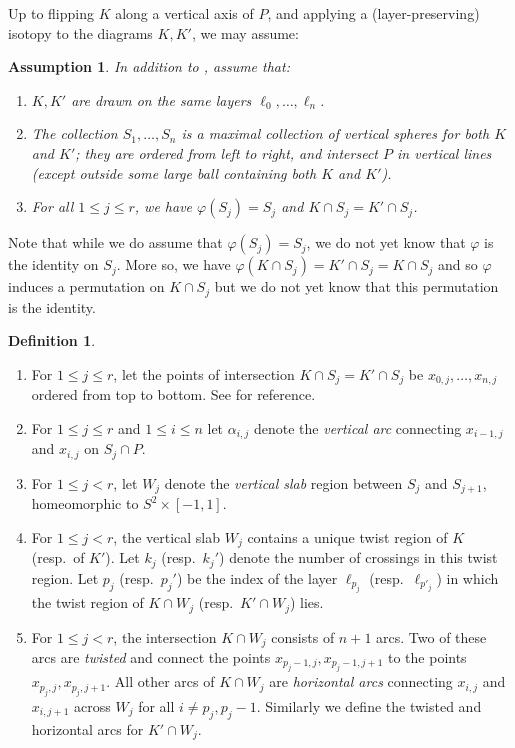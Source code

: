 \documentclass[12pt,reqno]{amsart}
\theoremstyle{plain}
\newtheorem{assumption}[theorem]{Assumption}
\theoremstyle{definition}
\newtheorem{definition}[theorem]{Definition}
\begin{document}
Up to flipping $K$ along a vertical axis of $P$, and applying a (layer-preserving) 
isotopy to the diagrams $K,K'$, we may assume:
\begin{assumption}\label{assum:FlipVertical}
In addition to , assume that:
\begin{enumerate}
\item $K,K'$ are drawn on the same layers $\ell_0,\dots,\ell_n$.
\item The collection $S_1,\dots,S_n$ is a maximal collection of vertical spheres for 
both $K$ and $K'$; they are ordered from left to right, and intersect $P$ in vertical 
lines (except outside some large ball containing both $K$ and $K'$). 
\item For all $1\le j\le r$, we have $ \varphi(S_j) = S_j$ and $K\cap S_j = K'\cap S_j$.
\end{enumerate}
\end{assumption}

Note that while we do assume that $\varphi(S_j) = S_j$, we do not yet know that $\varphi$ 
is the identity on $S_j$. More so, we have $\varphi(K\cap S_j)=K'\cap S_j = K\cap S_j$ 
and so $\varphi$ induces a permutation on $K\cap S_j$ but we do not yet know that this
permutation is the identity.

\begin{definition}\label{def:VerticalSlab} \hfill 
\begin{enumerate}

\item For $1\le j \le  r$, let the points of intersection $K\cap S_j=K'\cap S_j$ 
be $x_{0,j},\dots,x_{n,j}$ ordered from top to bottom. See  
for reference. 

\item For $1\le j \le r$ and $1\le i\le  n$ let $\alpha_{i,j}$ denote the 
\emph{vertical arc} connecting $x_{i-1,j}$ and $x_{i,j}$ on $S_j\cap P$.

\item For $1\le j <r$, let $W_j$ denote the \emph{vertical slab} region 
between $S_j$ and $S_{j+1}$, homeomorphic to $S^2\times [-1,1]$. 

\item For $1\le j <r$, the vertical slab $W_j$ contains a unique twist region 
of $K$ (resp.\ of $K'$). Let $k_j$ (resp.\ $k_j'$) denote the number of crossings 
in this twist region.
Let $p_j$ (resp.\ $p_j'$) be the index of the layer $\ell_{p_j}$ (resp.\ $\ell_{p'_j}$) 
in which the twist region of $K\cap W_j$ (resp.\ $K'\cap W_j$) lies.

\item For $1\le j <r$, the intersection $K\cap W_j$ consists of $n+1$ arcs. Two of 
these arcs are \emph{twisted} and connect 
the points $x_{p_j-1,j},x_{p_j-1,j+1}$ to the points $x_{p_j,j},x_{p_j,j+1}$. 
All other arcs of $K\cap W_j$ are \emph{horizontal arcs} connecting $x_{i,j}$ and 
$x_{i,j+1}$ across $W_j$ for all $i\ne p_j,p_j-1$. Similarly we define 
the twisted and horizontal arcs for $K'\cap W_j$.
\end{enumerate}
\end{definition}
\end{document}
